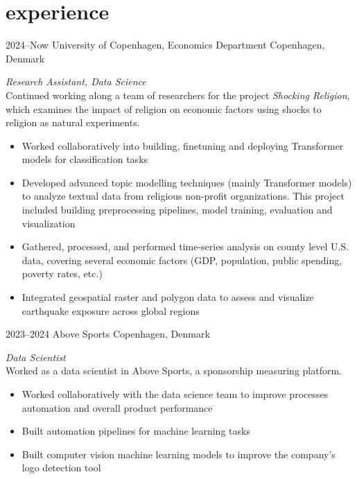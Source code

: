 \documentclass[]{friggeri-cv-a4}
\begin{document}

\section{experience}


\begin{entrylist}


\entry
{2024--Now}
{University of Copenhagen, Economics Department}
{Copenhagen, Denmark}
{\emph{Research Assistant, Data Science} \\
Continued working along a team of researchers for the project \emph{Shocking Religion}, which examines the impact of religion on economic factors using shocks to religion as natural experiments. \\
\begin{itemize}
\item Worked collaboratively into building, finetuning and deploying Transformer models for classification tasks
\item Developed advanced topic modelling techniques (mainly Transformer models) to analyze textual data from religious non-profit organizations. This project included building preprocessing pipelines, model training, evaluation and visualization
\item Gathered, processed, and performed time-series analysis on county level U.S. data, covering several economic factors (GDP, population, public spending, poverty rates, etc.)
\item Integrated geospatial raster and polygon data to assess and visualize earthquake exposure across global regions
\end{itemize}}


\entry
{2023--2024}
{Above Sports}
{Copenhagen, Denmark}
{\emph{Data Scientist} \\
Worked as a data scientist in Above Sports, a sponsorship measuring platform.
\begin{itemize}
\item Worked collaboratively with the data science team to improve processes automation and overall product performance
\item Built automation pipelines for machine learning tasks
\item Built computer vision machine learning models to improve the company's logo detection tool
\end{itemize}}


\end{entrylist}
\end{document}
